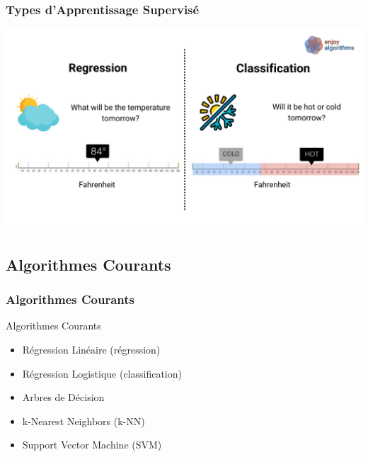 \documentclass[11pt]{beamer}
\begin{document}
\begin{frame}
\frametitle{Types d’Apprentissage Supervisé}
\begin{center}
\includegraphics[scale=0.25]{images/regression vs classification.png} 
\end{center}
\end{frame}

\subsection[Algorithmes Courants]{Algorithmes Courants}
\begin{frame}
\frametitle{Algorithmes Courants}
\begin{block}{Algorithmes Courants}
\begin{itemize}
	\item Régression Linéaire (régression)
	\item Régression Logistique (classification)
	\item Arbres de Décision
	\item k-Nearest Neighbors (k-NN)
	\item Support Vector Machine (SVM)
\end{itemize}
\end{block}
\end{frame}
\end{document}
